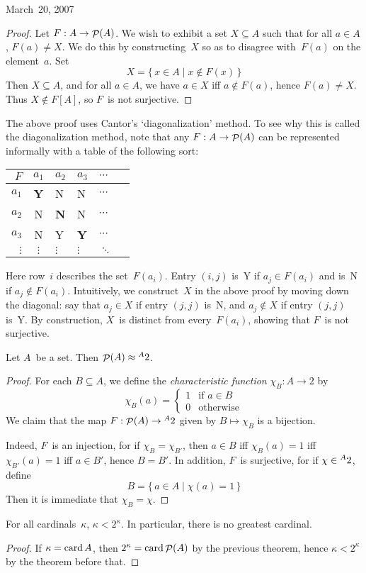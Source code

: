 \begin{lecture}{March~20, 2007}
\begin{proof}
Let \(F:A\to\mathop{\mathcal{P}}(A)\). We wish to exhibit a set \(X\subseteq A\) such that for all \(a\in A\), \(F(a)\ne X\). We do this by constructing~\(X\) so as to disagree with~\(F(a)\) on the element~\(a\). Set
\[X=\{\,x\in A\mid x\not\in F(x)\,\}\]
Then \(X\subseteq A\), and for all \(a\in A\), we have \(a\in X\) iff \(a\not\in F(a)\), hence \(F(a)\ne X\). Thus \(X\not\in F[A]\), so \(F\)~is not surjective.
\end{proof}
\noindent The above proof uses Cantor's `diagonalization' method. To see why this is called the diagonalization method, note that any \(F:A\to\mathop{\mathcal{P}}(A)\) can be represented informally with a table of the following sort:
\begin{center}
\begin{tabular}{r|cllll}
\(F\)&\(a_1\)&\(a_2\)&\(a_3\)&\(\cdots\)\\
\hline
\(a_1\)&\textbf{Y}&N&N&\(\cdots\)\\
\(a_2\)&N&\textbf{N}&N&\(\cdots\)\\
\(a_3\)&N&Y&\textbf{Y}&\(\cdots\)\\
\(\vdots\)&\(\vdots\)&\(\vdots\)&\(\vdots\)&\(\ddots\)
\end{tabular}
\end{center}
Here row~\(i\) describes the set~\(F(a_i)\). Entry \((i,j)\) is~Y if \(a_j\in F(a_i)\) and is~N if \(a_j\not\in F(a_i)\). Intuitively, we construct~\(X\) in the above proof by moving down the diagonal: say that \(a_j\in X\) if entry \((j,j)\) is~N, and \(a_j\not\in X\) if entry \((j,j)\) is~Y. By construction, \(X\)~is distinct from every~\(F(a_i)\), showing that \(F\)~is not surjective.
\begin{thm}
Let \(A\)~be a set. Then \(\mathop{\mathcal{P}}(A)\approx{}^{A}{2}\).
\end{thm}
\begin{proof}
For each \(B\subseteq A\), we define the \emph{characteristic function} \(\chi_B:A\to 2\) by
\[\chi_B(a)=
\begin{cases}
1&\text{if }a\in B\\
0&\text{otherwise}
\end{cases}\]
We claim that the map \(F:\mathop{\mathcal{P}}(A)\to{}^{A}{2}\) given by \(B\mapsto\chi_B\) is a bijection.

Indeed, \(F\)~is an injection, for if \(\chi_B=\chi_{B'}\), then \(a\in B\) iff \(\chi_B(a)=1\) iff \(\chi_{B'}(a)=1\) iff \(a\in B'\), hence \(B=B'\). In addition, \(F\)~is surjective, for if \(\chi\in{}^{A}{2}\), define
\[B=\{\,a\in A\mid \chi(a)=1\,\}\]
Then it is immediate that \(\chi_B=\chi\).
\end{proof}
\begin{cor}
For all cardinals~\(\kappa\), \(\kappa<2^{\kappa}\). In particular, there is no greatest cardinal.
\end{cor}
\begin{proof}
If \(\kappa=\operatorname{card} A\), then \(2^{\kappa}=\operatorname{card}\mathop{\mathcal{P}}(A)\) by the previous theorem, hence \(\kappa<2^{\kappa}\) by the theorem before that.
\end{proof}


\end{lecture}
